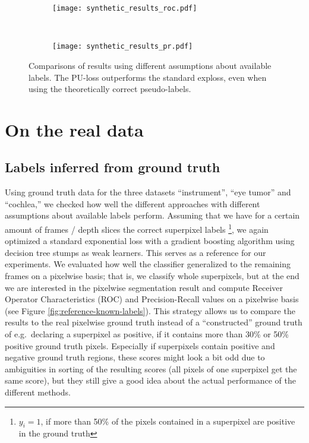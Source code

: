 \begin{figure}[ht]
	\centering
	\begin{subfigure}[h]{0.49\textwidth}
	\texttt{[image: synthetic\_results\_roc.pdf]}	
	\end{subfigure}
	~
	\begin{subfigure}[h]{0.49\textwidth}
	\texttt{[image: synthetic\_results\_pr.pdf]}	
	\end{subfigure}
	\caption{Comparisons of results using different assumptions about available labels. The PU-loss outperforms the standard exploss, even when using the theoretically correct pseudo-labels.}
	\label{fig:synthetic_results}
\end{figure}


\section{On the real data}
\subsection{Labels inferred from ground truth}
Using ground truth data for the three datasets ``instrument'', ``eye tumor'' and ``cochlea,'' we checked how well the different approaches with different assumptions about available labels perform. 
Assuming that we have for a certain amount of frames / depth slices the correct superpixel labels \footnote{$y_i = 1$, if more than 50\% of the pixels contained in a superpixel are positive in the ground truth}, we again optimized a standard exponential loss with a gradient boosting algorithm using decision tree stumps as weak learners. 
This serves as a reference for our experiments.
We evaluated how well the classifier generalized to the remaining frames on a pixelwise basis; that is, we classify whole superpixels, but at the end we are interested in the pixelwise segmentation result and compute Receiver Operator Characteristics (ROC) and Precision-Recall values on a pixelwise basis (see Figure \ref{fig:reference-known-labels}). 
This strategy allows us to compare the results to the real pixelwise ground truth instead of a ``constructed'' ground truth of e.g.\ declaring a superpixel as positive, if it contains more than 30\% or 50\% positive ground truth pixels.
Especially if superpixels contain positive and negative ground truth regions, these scores might look a bit odd due to ambiguities in sorting of the resulting scores (all pixels of one superpixel get the same score), but they still give a good idea about the actual performance of the different methods. 

